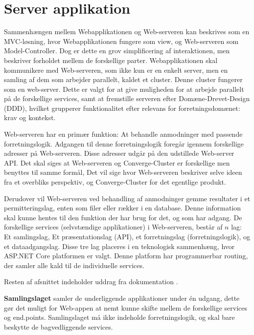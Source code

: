 
\section{Server applikation}

Sammenhængen mellem Webapplikationen og Web-serveren kan beskrives som en MVC-løsning, hvor Webapplikationen fungere som view, og Web-serveren som Model-Controller. Dog er dette en grov simplificering af interaktionen, men beskriver forholdet mellem de forskellige parter. Webapplikationen skal kommunikere med Web-serveren, som ikke kun er en enkelt server, men en samling af dem som arbejder parallelt, kaldet et cluster. Denne cluster fungerer som en web-server. Dette er valgt for at give muligheden for at arbejde parallelt på de forskellige services, samt at fremstille serveren efter Domæne-Drevet-Design (DDD), hvilket grupperer funktionalitet efter relevans for forretningsdomænet: krav og kontekst.

Web-serveren har en primær funktion: At behandle anmodninger med passende forretningslogik. Adgangen til denne forretningslogik foregår igennem forskellige adresser på Web-serveren. Disse adresser udgår på den udstillede Web-server API. Det skal siges at Web-serveren og Converge-Cluster er forskellige men benyttes til samme formål, Det vil sige hvor Web-serveren beskriver selve ideen fra et overbliks perspektiv, og Converge-Cluster for det egentlige produkt.

Derudover vil Web-serveren ved behandling af anmodninger gemme resultater i et permitteringslag, enten som filer eller rækker i en database. Denne information skal kunne hentes til den funktion der har brug for det, og som har adgang. De forskellige services (selvstændige applikationer) i Web-serveren,  består af $n$ lag: Et samlingslag, Et præsentationslag (API), et forretningslag (forretningslogik), og et dataadgangslag. Disse tre lag placeres i en teknologisk sammenhæng, hvor ASP.NET Core platformen er valgt. Denne platform har programmerbar routing, der samler alle kald til de individuelle services.

Resten af afsnittet indeholder uddrag fra dokumentation \cite{software-architecture}.



\textbf{Samlingslaget} samler de underliggende applikationer under én udgang, dette gør det muligt for Web-appen at nemt kunne skifte mellem de forskellige services og end.points. Samlingslaget må ikke indeholde forretningslogik, og skal bare beskytte de bagvedliggende services.


